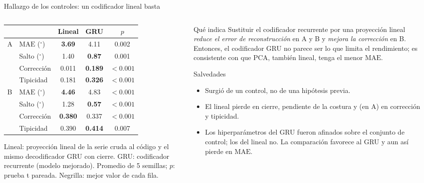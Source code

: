 \documentclass[aspectratio=169,10pt,t]{beamer}
\newcommand{\gr}{$^\circ$}
\newcommand{\mae}{\ensuremath{\mathrm{MAE}}}
\begin{document}
\begin{frame}{Hallazgo de los controles: un codificador lineal basta}
\begin{columns}[T]
\begin{column}{0.54\textwidth}
\footnotesize\setlength{\tabcolsep}{3pt}
\begin{tabular}{@{}llccc@{}}
\toprule
 & & \textbf{Lineal} & \textbf{GRU} & \textbf{$p$}\\
\midrule
\multirow{4}{*}{A} & \mae{} (\gr) & \textbf{3.69} & 4.11 & 0.002\\
 & Salto (\gr) & 1.40 & \textbf{0.87} & 0.001\\
 & Corrección & 0.011 & \textbf{0.189} & $<0.001$\\
 & Tipicidad & 0.181 & \textbf{0.326} & $<0.001$\\
\midrule
\multirow{4}{*}{B} & \mae{} (\gr) & \textbf{4.46} & 4.83 & $<0.001$\\
 & Salto (\gr) & 1.28 & \textbf{0.57} & $<0.001$\\
 & Corrección & \textbf{0.380} & 0.337 & $<0.001$\\
 & Tipicidad & 0.390 & \textbf{0.414} & 0.007\\
\bottomrule
\end{tabular}

\vspace{4pt}
{\scriptsize Lineal: proyección lineal de la serie cruda al código y el mismo decodificador GRU con cierre. GRU: codificador recurrente (modelo mejorado). Promedio de 5 semillas; $p$: prueba t pareada. Negrilla: mejor valor de cada fila.}
\end{column}
\begin{column}{0.44\textwidth}
\begin{block}{Qué indica}\scriptsize
Sustituir el codificador recurrente por una proyección lineal \emph{reduce el error de reconstrucción} en A y B y \emph{mejora la corrección} en B. Entonces, el codificador GRU no parece ser lo que limita el rendimiento; es consistente con que PCA, también lineal, tenga el menor \mae{}.
\end{block}
\begin{alertblock}{Salvedades}\scriptsize
\begin{itemize}\setlength{\itemsep}{1pt}
\item Surgió de un control, no de una hipótesis previa.
\item El lineal pierde en cierre, pendiente de la costura y (en A) en corrección y tipicidad.
\item Los hiperparámetros del GRU fueron afinados sobre el conjunto de control; los del lineal no. La comparación favorece al GRU y aun así pierde en \mae{}.
\end{itemize}
\end{alertblock}
\end{column}
\end{columns}
\end{frame}
\end{document}
